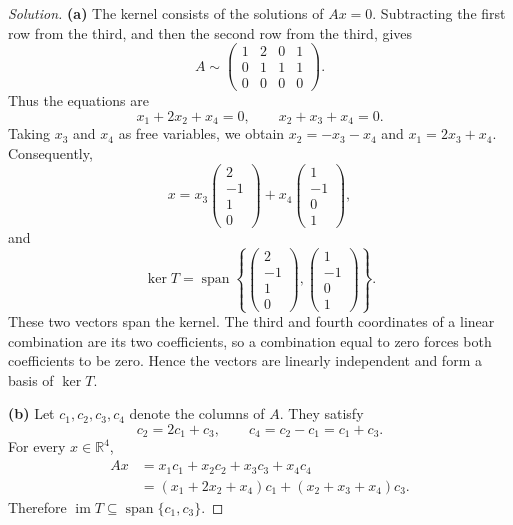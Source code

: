 \begin{proof}[Solution]
  \textbf{(a)} The kernel consists of the solutions of \(Ax=0\). Subtracting the
    first row from the third, and then the second row from the third, gives
    \[
      A\sim
      \begin{pmatrix}
        1&2&0&1\\
        0&1&1&1\\
        0&0&0&0
      \end{pmatrix}.
    \]
    Thus the equations are
    \[
      x_1+2x_2+x_4=0,
      \qquad
      x_2+x_3+x_4=0.
    \]
    Taking \(x_3\) and \(x_4\) as free variables, we obtain
    \(x_2=-x_3-x_4\) and \(x_1=2x_3+x_4\). Consequently,
    \[
      x=
      x_3\begin{pmatrix}2\\-1\\1\\0\end{pmatrix}
      +x_4\begin{pmatrix}1\\-1\\0\\1\end{pmatrix},
    \]
    and
    \[
      \ker T=
      \operatorname{span}\left\{
        \begin{pmatrix}2\\-1\\1\\0\end{pmatrix},
        \begin{pmatrix}1\\-1\\0\\1\end{pmatrix}
      \right\}.
    \]
    These two vectors span the kernel. The third and fourth coordinates
    of a linear combination are its two coefficients, so a combination
    equal to zero forces both coefficients to be zero. Hence the vectors
    are linearly independent and form a basis of \(\ker T\).

  \textbf{(b)} Let \(c_1,c_2,c_3,c_4\) denote the columns of \(A\). They satisfy
    \[
      c_2=2c_1+c_3,
      \qquad
      c_4=c_2-c_1=c_1+c_3.
    \]
    For every \(x\in\mathbb{R}^4\),
    \begin{align*}
      Ax
        &=x_1c_1+x_2c_2+x_3c_3+x_4c_4\\
        &=(x_1+2x_2+x_4)c_1+(x_2+x_3+x_4)c_3.
    \end{align*}
    Therefore \(\operatorname{im}T\subseteq
    \operatorname{span}\{c_1,c_3\}\).


\end{proof}
